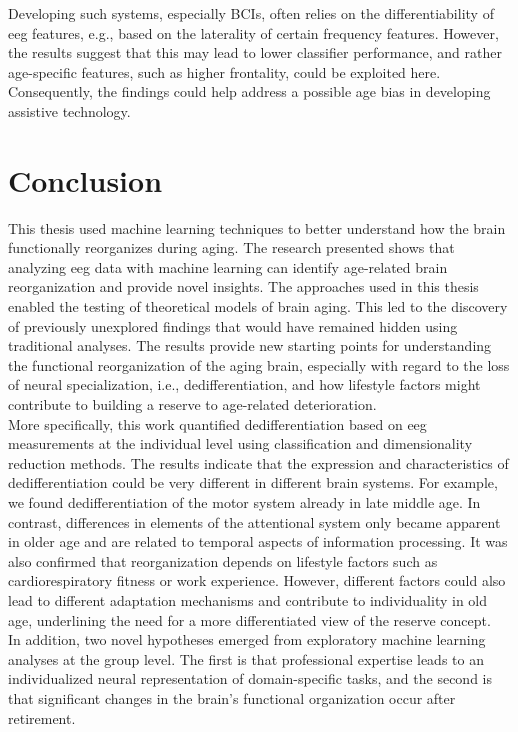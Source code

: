 Developing such systems, especially BCIs, often relies on the differentiability of \gls{eeg} features, e.g., based on the laterality of certain frequency features. However, the results suggest that this may lead to lower classifier performance, and rather age-specific features, such as higher frontality, could be exploited here. Consequently, the findings could help address a possible age bias in developing assistive technology.

\section{Conclusion}
This thesis used machine learning techniques to better understand how the brain functionally reorganizes during aging. The research presented shows that analyzing \gls{eeg} data with machine learning can identify age-related brain reorganization and provide novel insights. The approaches used in this thesis enabled the testing of theoretical models of brain aging. This led to the discovery of previously unexplored findings that would have remained hidden using traditional analyses. The results provide new starting points for understanding the functional reorganization of the aging brain, especially with regard to the loss of neural specialization, i.e., dedifferentiation, and how lifestyle factors might contribute to building a reserve to age-related deterioration.\\
More specifically, this work quantified dedifferentiation based on \gls{eeg} measurements at the individual level using classification and dimensionality reduction methods. The results indicate that the expression and characteristics of dedifferentiation could be very different in different brain systems. For example, we found dedifferentiation of the motor system already in late middle age. In contrast, differences in elements of the attentional system only became apparent in older age and are related to temporal aspects of information processing. It was also confirmed that reorganization depends on lifestyle factors such as cardiorespiratory fitness or work experience. However, different factors could also lead to different adaptation mechanisms and contribute to individuality in old age, underlining the need for a more differentiated view of the reserve concept.\\
In addition, two novel hypotheses emerged from exploratory machine learning analyses at the group level. The first is that professional expertise leads to an individualized neural representation of domain-specific tasks, and the second is that significant changes in the brain's functional organization occur after retirement.\\
